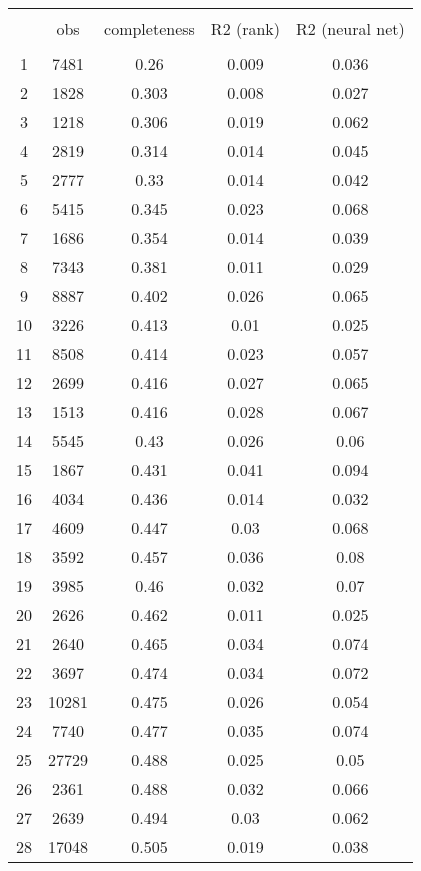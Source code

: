 
\begin{tabular}{@{\extracolsep{2pt}} ccccc} 
\\[-1.8ex]\hline 
\hline \\[-1.8ex] 
 & obs & completeness & R2 (rank) & R2 (neural net) \\ 
\hline \\[-1.8ex] 
1 & 7481 & 0.26 & 0.009 & 0.036 \\ 
2 & 1828 & 0.303 & 0.008 & 0.027 \\ 
3 & 1218 & 0.306 & 0.019 & 0.062 \\ 
4 & 2819 & 0.314 & 0.014 & 0.045 \\ 
5 & 2777 & 0.33 & 0.014 & 0.042 \\ 
6 & 5415 & 0.345 & 0.023 & 0.068 \\ 
7 & 1686 & 0.354 & 0.014 & 0.039 \\ 
8 & 7343 & 0.381 & 0.011 & 0.029 \\ 
9 & 8887 & 0.402 & 0.026 & 0.065 \\ 
10 & 3226 & 0.413 & 0.01 & 0.025 \\ 
11 & 8508 & 0.414 & 0.023 & 0.057 \\ 
12 & 2699 & 0.416 & 0.027 & 0.065 \\ 
13 & 1513 & 0.416 & 0.028 & 0.067 \\ 
14 & 5545 & 0.43 & 0.026 & 0.06 \\ 
15 & 1867 & 0.431 & 0.041 & 0.094 \\ 
16 & 4034 & 0.436 & 0.014 & 0.032 \\ 
17 & 4609 & 0.447 & 0.03 & 0.068 \\ 
18 & 3592 & 0.457 & 0.036 & 0.08 \\ 
19 & 3985 & 0.46 & 0.032 & 0.07 \\ 
20 & 2626 & 0.462 & 0.011 & 0.025 \\ 
21 & 2640 & 0.465 & 0.034 & 0.074 \\ 
22 & 3697 & 0.474 & 0.034 & 0.072 \\ 
23 & 10281 & 0.475 & 0.026 & 0.054 \\ 
24 & 7740 & 0.477 & 0.035 & 0.074 \\ 
25 & 27729 & 0.488 & 0.025 & 0.05 \\ 
26 & 2361 & 0.488 & 0.032 & 0.066 \\ 
27 & 2639 & 0.494 & 0.03 & 0.062 \\ 
28 & 17048 & 0.505 & 0.019 & 0.038 \\ 

\end{tabular}
